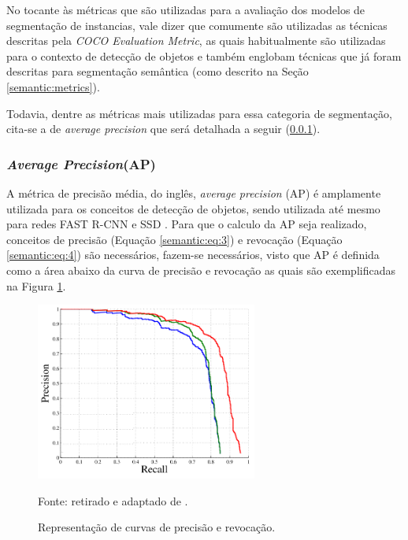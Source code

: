 No tocante às métricas que são utilizadas para a avaliação dos modelos de segmentação de instancias, vale dizer que comumente são utilizadas as técnicas descritas pela \textit{COCO Evaluation Metric}\cite{Lin2016}, as quais habitualmente são utilizadas para o contexto de detecção de objetos e também englobam técnicas que já foram descritas para segmentação semântica (como descrito na Seção \ref{semantic:metrics}).

Todavia, dentre as métricas mais utilizadas para essa categoria de segmentação, cita-se a de \textit{average precision} que será detalhada a seguir (\ref{instance:AP}).


\subsubsection{\textit{Average Precision}(AP)}
\label{instance:AP}

A métrica de precisão média, do inglês, \textit{average precision} (AP) é amplamente utilizada para os conceitos de detecção de objetos, sendo utilizada até mesmo para redes FAST R-CNN \cite{Girshick2014} e SSD \cite{Liu2015SSD:Detector}. Para que o calculo da AP seja realizado, conceitos de precisão (Equação \ref{semantic:eq:3}) e revocação (Equação \ref{semantic:eq:4}) são necessários, fazem-se necessários, visto que AP é definida como a área abaixo da curva de precisão e revocação \cite{Hariharan2014} as quais são exemplificadas na Figura \ref{instance:fig:1}.

\begin{figure}[H]
    \centering
    \caption{Representação de curvas de precisão e revocação.}
    \includegraphics[height=2.3in]{recursos/imagens/instance/prec_revo.png}
    \label{instance:fig:1}

    \vspace*{1 cm}
    Fonte: retirado e adaptado de \cite{Hariharan2014}.
\end{figure}

